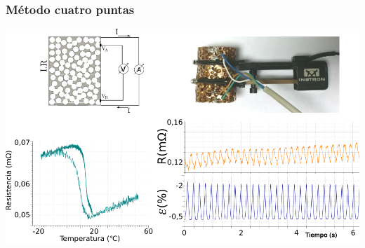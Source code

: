 \documentclass[usenames,dvipsnames]{beamer}
\begin{document}
\begin{frame}
\frametitle{Método cuatro puntas}

% 
% 
% 
% 

\begin{center}
\includegraphics[width=1\textwidth]{img/resistencia/cuatro_puntas.png}
\end{center}
\end{frame}
\end{document}
